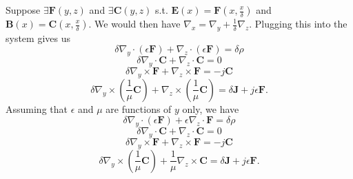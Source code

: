 \documentclass{article}
\theoremstyle{plain}
\begin{document}
Suppose $\exists \mathbf{F}(y,z)$ and $\exists \mathbf{C}(y,z)$ s.t. $\mathbf{E}(x) = \mathbf{F}(x,\frac{x}{\delta})$ and $\mathbf{B}(x) = \mathbf{C}(x,\frac{x}{\delta})$. We would then have $\nabla_x = \nabla_y + \frac{1}{\delta}\nabla_z$. Plugging this into the system gives us
\begin{equation}\label{eq:max1b}
	\delta\nabla_y\cdot\left(\epsilon\mathbf{F}\right) + \nabla_z\cdot\left(\epsilon\mathbf{F}\right) = \delta\rho
\end{equation}
\begin{equation}\label{eq:max2b}
	\delta\nabla_y\cdot\mathbf{C} + \nabla_z\cdot\mathbf{C} = 0
\end{equation}
\begin{equation}\label{eq:max3b}
	\delta\nabla_y\times\mathbf{F} + \nabla_z\times\mathbf{F} = -j\mathbf{C}
\end{equation}
\begin{equation}\label{eq:max4b}
	\delta\nabla_y\times\left(\frac{1}{\mu}\mathbf{C}\right) + \nabla_z\times\left(\frac{1}{\mu}\mathbf{C}\right) = \delta\mathbf{J} + j\epsilon\mathbf{F}.
\end{equation}
Assuming that $\epsilon$ and $\mu$ are functions of $y$ only, we have
\begin{equation}\label{eq:max1c}
	\delta\nabla_y\cdot\left(\epsilon\mathbf{F}\right) + \epsilon\nabla_z\cdot\mathbf{F} = \delta\rho
\end{equation}
\begin{equation}\label{eq:max2c}
	\delta\nabla_y\cdot\mathbf{C} + \nabla_z\cdot\mathbf{C} = 0
\end{equation}
\begin{equation}\label{eq:max3c}
	\delta\nabla_y\times\mathbf{F} + \nabla_z\times\mathbf{F} = -j\mathbf{C}
\end{equation}
\begin{equation}\label{eq:max4c}
	\delta\nabla_y\times\left(\frac{1}{\mu}\mathbf{C}\right) + \frac{1}{\mu}\nabla_z\times\mathbf{C} = \delta\mathbf{J} + j\epsilon\mathbf{F}.
\end{equation}
\end{document}
